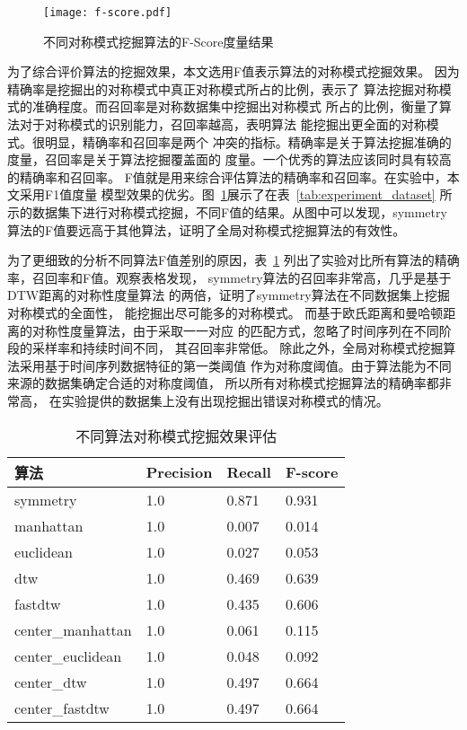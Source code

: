 \begin{figure}
  \centering
  \texttt{[image: f-score.pdf]}
  \caption{不同对称模式挖掘算法的F-Score度量结果}
  \label{fig:fscore_compare}
\end{figure}

为了综合评价算法的挖掘效果，本文选用F值表示算法的对称模式挖掘效果。
因为精确率是挖掘出的对称模式中真正对称模式所占的比例，表示了
算法挖掘对称模式的准确程度。而召回率是对称数据集中挖掘出对称模式
所占的比例，衡量了算法对于对称模式的识别能力，召回率越高，表明算法
能挖掘出更全面的对称模式。很明显，精确率和召回率是两个
冲突的指标。精确率是关于算法挖掘准确的度量，召回率是关于算法挖掘覆盖面的
度量。一个优秀的算法应该同时具有较高的精确率和召回率。
F值就是用来综合评估算法的精确率和召回率。在实验中，本文采用F1值度量
模型效果的优劣。图~\ref{fig:fscore_compare}展示了在表~\ref{tab:experiment_dataset}
所示的数据集下进行对称模式挖掘，不同F值的结果。从图中可以发现，symmetry
算法的F值要远高于其他算法，证明了全局对称模式挖掘算法的有效性。

为了更细致的分析不同算法F值差别的原因，表~\ref{tab:experiment_global_algo}
列出了实验对比所有算法的精确率，召回率和F值。观察表格发现，
symmetry算法的召回率非常高，几乎是基于DTW距离的对称性度量算法
的两倍，证明了symmetry算法在不同数据集上挖掘对称模式的全面性，
能挖掘出尽可能多的对称模式。
而基于欧氏距离和曼哈顿距离的对称性度量算法，由于采取一一对应
的匹配方式，忽略了时间序列在不同阶段的采样率和持续时间不同，
其召回率非常低。
除此之外，全局对称模式挖掘算法采用基于时间序列数据特征的第一类阈值
作为对称度阈值。由于算法能为不同来源的数据集确定合适的对称度阈值，
所以所有对称模式挖掘算法的精确率都非常高，
在实验提供的数据集上没有出现挖掘出错误对称模式的情况。


\begin{table}
  \centering
  \caption{不同算法对称模式挖掘效果评估}
  \begin{tabular}{llll}
    \toprule
    算法          & Precision   & Recall & F-score                        \\
    \midrule
    symmetry          & 1.0   & 0.871 & 0.931   \\
    manhattan         & 1.0  & 0.007 & 0.014 \\
    euclidean         & 1.0  & 0.027 & 0.053 \\
    dtw               & 1.0  & 0.469 & 0.639  \\
    fastdtw           & 1.0  & 0.435 & 0.606 \\
    center\_manhattan & 1.0  & 0.061 & 0.115 \\
    center\_euclidean & 1.0  & 0.048 & 0.092  \\
    center\_dtw       & 1.0  & 0.497 & 0.664  \\
    center\_fastdtw   & 1.0  & 0.497 & 0.664 \\
    \bottomrule
  \end{tabular}
  \label{tab:experiment_global_algo}
\end{table}

